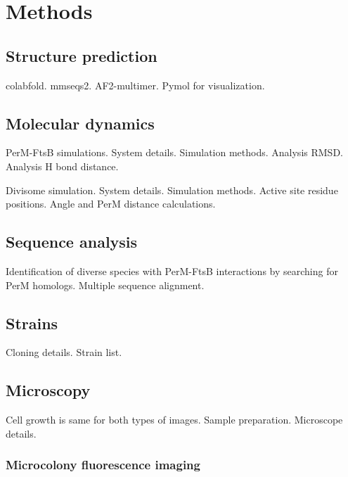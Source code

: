 \documentclass[pdflatex,sn-basic]{sn-jnl}%
\begin{document}



\section{Methods}

\subsection{Structure prediction}

colabfold.
mmseqs2.
AF2-multimer.
Pymol for visualization.

\loremipsum{}

\subsection{Molecular dynamics}

PerM-FtsB simulations.
System details.
Simulation methods.
Analysis RMSD.
Analysis H bond distance.

Divisome simulation. System details. Simulation methods. Active site residue positions. Angle and PerM distance calculations.

\loremipsum{}

\subsection{Sequence analysis}

Identification of diverse species with PerM-FtsB interactions by searching for PerM homologs.
Multiple sequence alignment.

\loremipsum{}

\subsection{Strains}

Cloning details.
Strain list.

\loremipsum{} 

\subsection{Microscopy}

Cell growth is same for both types of images.
Sample preparation.
Microscope details.

\loremipsum{}

\subsubsection{Microcolony fluorescence imaging}
\end{document}
